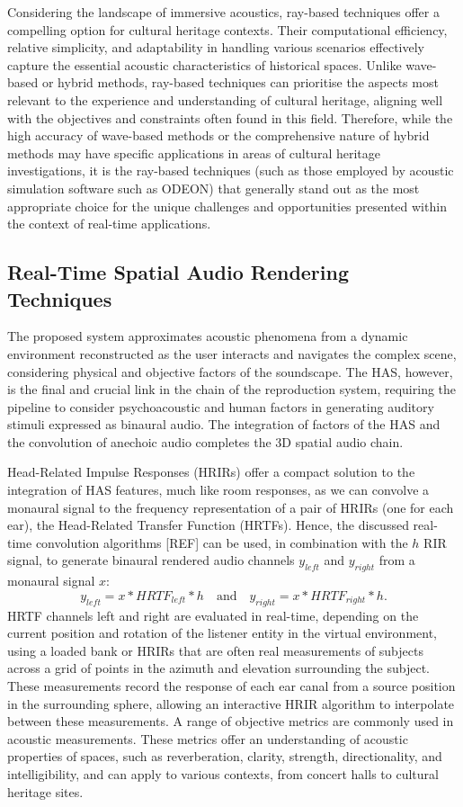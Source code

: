 Considering the landscape of immersive acoustics, ray-based techniques offer a compelling option for cultural heritage contexts. Their computational efficiency, relative simplicity, and adaptability in handling various scenarios effectively capture the essential acoustic characteristics of historical spaces. Unlike wave-based or hybrid methods, ray-based techniques can prioritise the aspects most relevant to the experience and understanding of cultural heritage, aligning well with the objectives and constraints often found in this field. Therefore, while the high accuracy of wave-based methods or the comprehensive nature of hybrid methods may have specific applications in areas of cultural heritage investigations, it is the ray-based techniques (such as those employed by acoustic simulation software such as ODEON) that generally stand out as the most appropriate choice for the unique challenges and opportunities presented within the context of real-time applications.

\subsection{Real-Time Spatial Audio Rendering Techniques}
The proposed system approximates acoustic phenomena from a dynamic environment reconstructed as the user interacts and navigates the complex scene, considering physical and objective factors of the soundscape. The HAS, however, is the final and crucial link in the chain of the reproduction system, requiring the pipeline to consider psychoacoustic and human factors in generating auditory stimuli expressed as binaural audio. The integration of factors of the HAS and the convolution of anechoic audio completes the 3D spatial audio chain.\par
Head-Related Impulse Responses (HRIRs) offer a compact solution to the integration of HAS features, much like room responses, as we can convolve a monaural signal to the frequency representation of a pair of HRIRs (one for each ear), the Head-Related Transfer Function (HRTFs). Hence, the discussed real-time convolution algorithms [REF] can be used, in combination with the $h$ RIR signal, to generate binaural rendered audio channels $y_{left}$ and $y_{right}$ from a monaural signal $x$:
\begin{equation}
    y_{left} = x * HRTF_{left} * h \quad \textrm{and} \quad  y_{right} = x * HRTF_{right} * h \textrm{.}
\end{equation}
HRTF channels left and right are evaluated in real-time, depending on the current position and rotation of the listener entity in the virtual environment, using a loaded bank or HRIRs that are often real measurements of subjects across a grid of points in the azimuth and elevation surrounding the subject. These measurements record the response of each ear canal from a source position in the surrounding sphere, allowing an interactive HRIR algorithm to interpolate between these measurements. A range of objective metrics are commonly used in acoustic measurements. These metrics offer an understanding of acoustic properties of spaces, such as reverberation, clarity, strength, directionality, and intelligibility, and can apply to various contexts, from concert halls to cultural heritage sites. 


